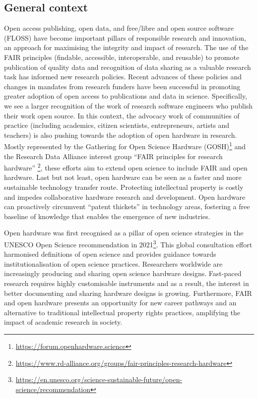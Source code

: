 \documentclass[
  12pt,
  a4paper,
]{article}
\begin{document}
\hypertarget{general-context}{%
\subsection{General context}\label{general-context}}

Open access publishing, open data, and free/libre and open source
software (FLOSS) have become important pillars of responsible research
and innovation, an approach for maximising the integrity and impact of
research. The use of the FAIR principles (findable, accessible,
interoperable, and reusable) to promote publication of quality data and
recognition of data sharing as a valuable research task has informed new
research policies. Recent advances of these policies and changes in
mandates from research funders have been successful in promoting greater
adoption of open access to publications and data in science.
Specifically, we see a larger recognition of the work of research
software engineers who publish their work open source. In this context,
the advocacy work of communities of practice (including academics,
citizen scientists, entrepreneurs, artists and teachers) is also pushing
towards the adoption of open hardware in research. Mostly represented by
the Gathering for Open Science Hardware (GOSH)\footnote{\url{https://forum.openhardware.science}}
and the Research Data Alliance interest group ``FAIR principles for
research hardware'' \footnote{\url{https://www.rd-alliance.org/groups/fair-principles-research-hardware}},
these efforts aim to extend open science to include FAIR and open
hardware. Last but not least, open hardware can be seen as a faster and
more sustainable technology transfer route. Protecting intellectual
property is costly and impedes collaborative hardware research and
development. Open hardware can proactively circumvent ``patent
thickets'' in technology areas, fostering a free baseline of knowledge
that enables the emergence of new industries.

Open hardware was first recognised as a pillar of open science
strategies in the UNESCO Open Science recommendation in 2021\footnote{\url{https://en.unesco.org/science-sustainable-future/open-science/recommendation}}.
This global consultation effort harmonised definitions of open science
and provides guidance towards institutionalisation of open science
practices. Researchers worldwide are increasingly producing and sharing
open science hardware designs. Fast-paced research requires highly
customisable instruments and as a result, the interest in better
documenting and sharing hardware designs is growing. Furthermore, FAIR
and open hardware presents an opportunity for new career pathways and an
alternative to traditional intellectual property rights practices,
amplifying the impact of academic research in society.
\end{document}

